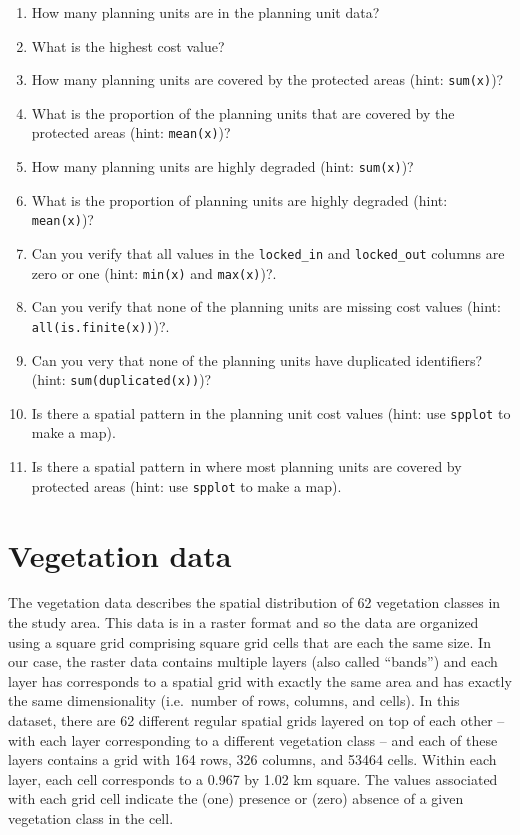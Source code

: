 \documentclass[
  12pt,
]{book}
\makeatletter
\providecommand{\tightlist}{%
  \setlength{\itemsep}{0pt}\setlength{\parskip}{0pt}}
\newenvironment{kframe}{%
\medskip{}
\setlength{\fboxsep}{.8em}
 \def\at@end@of@kframe{}%
 \ifinner\ifhmode%
  \def\at@end@of@kframe{\end{minipage}}%
  \begin{minipage}{\columnwidth}%
 \fi\fi%
 \def\FrameCommand##1{\hskip\@totalleftmargin \hskip-\fboxsep
 \colorbox{shadecolor}{##1}\hskip-\fboxsep
     \hskip-\linewidth \hskip-\@totalleftmargin \hskip\columnwidth}%
 \MakeFramed {\advance\hsize-\width
   \@totalleftmargin\z@ \linewidth\hsize
   \@setminipage}}%
 {\par\unskip\endMakeFramed%
 \at@end@of@kframe}
\newenvironment{rmdblock}[1]
  {
  \begin{itemize}
  \renewcommand{\labelitemi}{
    \raisebox{-.7\height}[0pt][0pt]{
      {\setkeys{Gin}{width=3em,keepaspectratio}\texttt{[image: images/\#1]}}
    }
  }
  \setlength{\fboxsep}{1em}
  \begin{kframe}
  \item
  }
  {
  \end{kframe}
  \end{itemize}
  }
\newenvironment{rmdquestion}
  {\begin{rmdblock}{question}}
  {\end{rmdblock}}
\makeatother
\begin{document}
\begin{rmdquestion}
\begin{enumerate}
\def\labelenumi{\arabic{enumi}.}
\tightlist
\item
  How many planning units are in the planning unit data?
\item
  What is the highest cost value?
\item
  How many planning units are covered by the protected areas (hint: \texttt{sum(x)})?
\item
  What is the proportion of the planning units that are covered by the protected areas (hint: \texttt{mean(x)})?
\item
  How many planning units are highly degraded (hint: \texttt{sum(x)})?
\item
  What is the proportion of planning units are highly degraded (hint: \texttt{mean(x)})?
\item
  Can you verify that all values in the \texttt{locked\_in} and \texttt{locked\_out} columns are zero or one (hint: \texttt{min(x)} and \texttt{max(x)})?.
\item
  Can you verify that none of the planning units are missing cost values (hint: \texttt{all(is.finite(x))})?.
\item
  Can you very that none of the planning units have duplicated identifiers? (hint: \texttt{sum(duplicated(x))})?
\item
  Is there a spatial pattern in the planning unit cost values (hint: use \texttt{spplot} to make a map).
\item
  Is there a spatial pattern in where most planning units are covered by protected areas (hint: use \texttt{spplot} to make a map).
\end{enumerate}
\end{rmdquestion}

\clearpage

\hypertarget{vegetation-data}{%
\section{Vegetation data}\label{vegetation-data}}

The vegetation data describes the spatial distribution of 62 vegetation classes in the study area. This data is in a raster format and so the data are organized using a square grid comprising square grid cells that are each the same size. In our case, the raster data contains multiple layers (also called ``bands'') and each layer has corresponds to a spatial grid with exactly the same area and has exactly the same dimensionality (i.e.~number of rows, columns, and cells). In this dataset, there are 62 different regular spatial grids layered on top of each other -- with each layer corresponding to a different vegetation class -- and each of these layers contains a grid with 164 rows, 326 columns, and 53464 cells. Within each layer, each cell corresponds to a 0.967 by 1.02 km square. The values associated with each grid cell indicate the (one) presence or (zero) absence of a given vegetation class in the cell.
\end{document}
